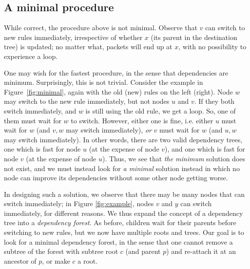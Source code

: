 



\subsection{A minimal procedure}
\label{sec:minimal}


While correct, the procedure above is not minimal. Observe that $v$ can switch to new rules immediately, irrespective of whether $x$ (its parent in the destination tree) is updated; no matter what, packets will end up at $x$, with no possibility to experience a loop.

One may wish for the fastest procedure, in the sense that dependencies are minimum. Surprisingly, this is not trivial. Consider the example in Figure~\ref{fig:minimal}, again with the old (new) rules on the left (right). Node $w$ may switch to the new rule immediately, but not nodes $u$ and $v$. If they both switch immediately, and $w$ is still using the old rule, we get a loop. So, one of them must wait for $w$ to switch. However, either one is fine, i.e. either $u$ must wait for $w$ (and $v,w$ may switch immediately), \emph{or} $v$ must wait for $w$ (and $u,w$ may switch immediately). In other words, there are two valid dependency trees, one which is fast for node $u$ (at the expense of node $v$), and one which is fast for node $v$ (at the expense of node $u$).
Thus, we see that \emph{the minimum} solution does not exist, and we must instead look for \emph{a minimal} solution instead in which no node can improve its dependencies without some other node getting worse.

In designing such a solution, we observe that there may be many nodes that can switch immediately; in Figure \ref{fig:example}, nodes $v$ and $y$ can switch immediately, for different reasons. We thus expand the concept of a dependency tree into a \emph{dependency forest}. As before, children wait for their parents before switching to new rules, but we now have multiple roots and trees. Our goal is to look for a minimal dependency forest, in the sense that one cannot remove a subtree of the forest with subtree root $c$ (and parent $p$) and re-attach it at an ancestor of $p$, or make $c$ a root.

